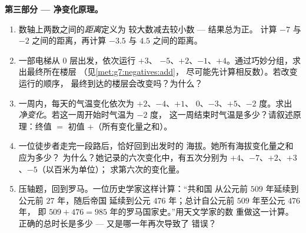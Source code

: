 \begin{problem}
\medskip
\noindent\textbf{第三部分 --- 净变化原理。}
\begin{enumerate}[resume]
  \item 数轴上两数之间的\emph{距离}定义为
        较大数减去较小数 --- 结果总为正。
        计算 $-7$ 与 $-2$ 之间的距离，再计算
        $-3.5$ 与 $4.5$ 之间的距离。
  \item 一部电梯从 $0$ 层出发，依次运行 $+3$、
        $-5$、$+2$、$-1$、$+4$。通过巧妙分组，求出最终所在楼层
        （见\cref{met:g7:negatives:add}，
        尽可能先计算相反数）。若改变运行的顺序，
        最终到达的楼层会改变吗？为什么？
  \item 一周内，每天的气温变化依次为 $+2$、$-4$、$+1$、
        $0$、$-3$、$+5$、$-2$ 度。求出
        \emph{净变化}。若这一周开始时气温为 $-2$ 度，
        这一周结束时气温是多少？请叙述原理：终值 $=$
        初值 $+$（所有变化量之和）。
  \item 一位徒步者走完一段路后，恰好回到出发时的
        海拔。她所有海拔变化量之和应为多少？
        为什么？她记录的六次变化中，有五次分别为
        $+4$、$-7$、$+2$、$+3$、$-5$（以百米为单位）；
        求第六次的变化量。
  \item 压轴题，回到罗马。一位历史学家这样计算：“共和国
        从公元前 $509$ 年延续到公元前 $27$ 年，随后帝国
        延续到公元 $476$ 年；总计自公元前 $509$ 年至公元 $476$ 年，
        即 $509 + 476 = 985$ 年的罗马国家史。”用天文学家的数
        重做这一计算。正确的总时长是多少 ---
        又是哪一年再次导致了
        错误？
\end{enumerate}
\end{problem}
